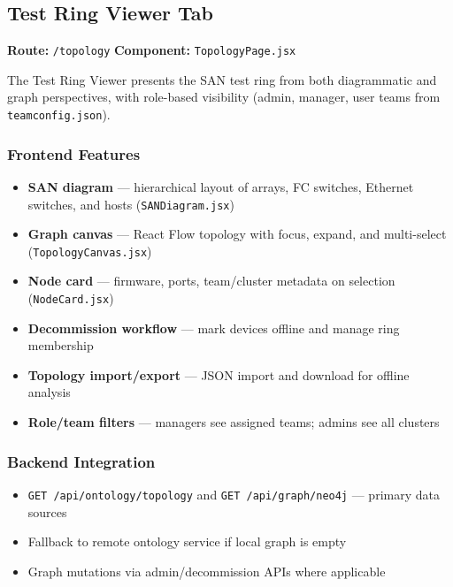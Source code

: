 \documentclass[11pt,a4paper]{article}
\begin{document}
\subsection{Test Ring Viewer Tab}

\textbf{Route:} \texttt{/topology} \quad \textbf{Component:} \texttt{TopologyPage.jsx}

The Test Ring Viewer presents the SAN test ring from both diagrammatic and graph perspectives, with role-based visibility (admin, manager, user teams from \texttt{teamconfig.json}).

\subsubsection{Frontend Features}

\begin{itemize}[leftmargin=1.5cm]
    \item \textbf{SAN diagram} --- hierarchical layout of arrays, FC switches, Ethernet switches, and hosts (\texttt{SANDiagram.jsx})
    \item \textbf{Graph canvas} --- React Flow topology with focus, expand, and multi-select (\texttt{TopologyCanvas.jsx})
    \item \textbf{Node card} --- firmware, ports, team/cluster metadata on selection (\texttt{NodeCard.jsx})
    \item \textbf{Decommission workflow} --- mark devices offline and manage ring membership
    \item \textbf{Topology import/export} --- JSON import and download for offline analysis
    \item \textbf{Role/team filters} --- managers see assigned teams; admins see all clusters
\end{itemize}

\subsubsection{Backend Integration}

\begin{itemize}[leftmargin=1.5cm]
    \item \texttt{GET /api/ontology/topology} and \texttt{GET /api/graph/neo4j} --- primary data sources
    \item Fallback to remote ontology service if local graph is empty
    \item Graph mutations via admin/decommission APIs where applicable
\end{itemize}
\end{document}
